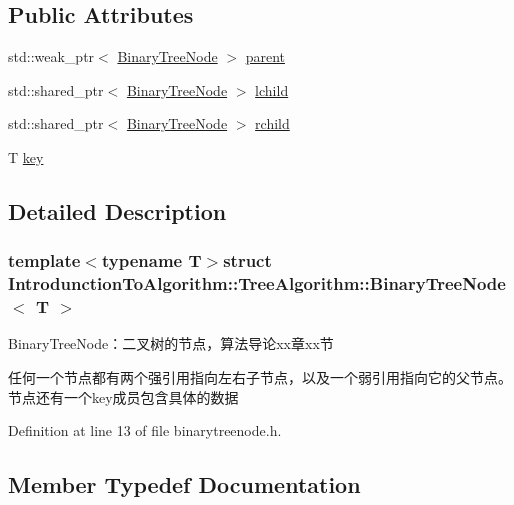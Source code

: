 \subsection*{Public Attributes}
\begin{DoxyCompactItemize}
\item 
std\+::weak\+\_\+ptr$<$ \hyperlink{struct_introdunction_to_algorithm_1_1_tree_algorithm_1_1_binary_tree_node}{Binary\+Tree\+Node} $>$ \hyperlink{struct_introdunction_to_algorithm_1_1_tree_algorithm_1_1_binary_tree_node_afa42d2a3e68838d17d1028fab12c71e1}{parent}
\item 
std\+::shared\+\_\+ptr$<$ \hyperlink{struct_introdunction_to_algorithm_1_1_tree_algorithm_1_1_binary_tree_node}{Binary\+Tree\+Node} $>$ \hyperlink{struct_introdunction_to_algorithm_1_1_tree_algorithm_1_1_binary_tree_node_a3f84ee829fc539e004bf3be6eb8fb882}{lchild}
\item 
std\+::shared\+\_\+ptr$<$ \hyperlink{struct_introdunction_to_algorithm_1_1_tree_algorithm_1_1_binary_tree_node}{Binary\+Tree\+Node} $>$ \hyperlink{struct_introdunction_to_algorithm_1_1_tree_algorithm_1_1_binary_tree_node_ae6dc3c9fce595c08cd3a31dba534fec3}{rchild}
\item 
T \hyperlink{struct_introdunction_to_algorithm_1_1_tree_algorithm_1_1_binary_tree_node_a3bcf52447a097b51caa74488e90f1479}{key}
\end{DoxyCompactItemize}


\subsection{Detailed Description}
\subsubsection*{template$<$typename T$>$struct Introdunction\+To\+Algorithm\+::\+Tree\+Algorithm\+::\+Binary\+Tree\+Node$<$ T $>$}

Binary\+Tree\+Node：二叉树的节点，算法导论xx章xx节 

任何一个节点都有两个强引用指向左右子节点，以及一个弱引用指向它的父节点。节点还有一个{\ttfamily key}成员包含具体的数据 

Definition at line 13 of file binarytreenode.\+h.



\subsection{Member Typedef Documentation}
\hypertarget{struct_introdunction_to_algorithm_1_1_tree_algorithm_1_1_binary_tree_node_a0967a0c85792f7b02a005eb1942d1bf5}{}
